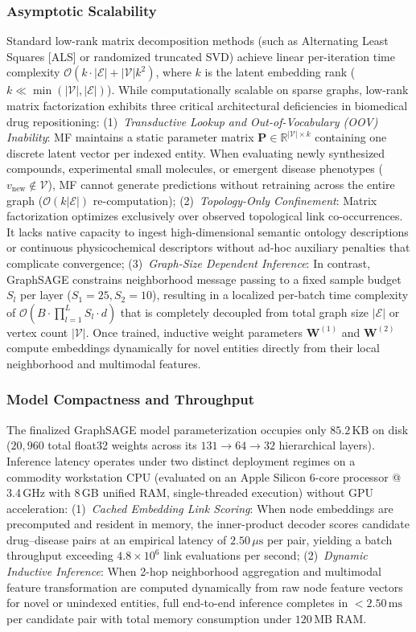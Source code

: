 \documentclass[conference,a4paper]{IEEEtran}
\begin{document}
\subsubsection{Asymptotic Scalability}
Standard low-rank matrix decomposition methods (such as Alternating Least Squares [ALS] or randomized truncated SVD) achieve linear per-iteration time complexity $\mathcal{O}(k \cdot |\mathcal{E}| + |\mathcal{V}| k^2)$, where $k$ is the latent embedding rank ($k \ll \min(|\mathcal{V}|, |\mathcal{E}|)$). While computationally scalable on sparse graphs, low-rank matrix factorization exhibits three critical architectural deficiencies in biomedical drug repositioning:
(1)~\textit{Transductive Lookup and Out-of-Vocabulary (OOV) Inability}: MF maintains a static parameter matrix $\mathbf{P} \in \mathbb{R}^{|\mathcal{V}| \times k}$ containing one discrete latent vector per indexed entity. When evaluating newly synthesized compounds, experimental small molecules, or emergent disease phenotypes ($v_{\text{new}} \notin \mathcal{V}$), MF cannot generate predictions without retraining across the entire graph ($\mathcal{O}(k |\mathcal{E}|)$ re-computation);
(2)~\textit{Topology-Only Confinement}: Matrix factorization optimizes exclusively over observed topological link co-occurrences. It lacks native capacity to ingest high-dimensional semantic ontology descriptions or continuous physicochemical descriptors without ad-hoc auxiliary penalties that complicate convergence;
(3)~\textit{Graph-Size Dependent Inference}: In contrast, GraphSAGE constrains neighborhood message passing to a fixed sample budget $S_l$ per layer ($S_1=25, S_2=10$), resulting in a localized per-batch time complexity of $\mathcal{O}(B \cdot \prod_{l=1}^L S_l \cdot d)$ that is completely decoupled from total graph size $|\mathcal{E}|$ or vertex count $|\mathcal{V}|$. Once trained, inductive weight parameters $\mathbf{W}^{(1)}$ and $\mathbf{W}^{(2)}$ compute embeddings dynamically for novel entities directly from their local neighborhood and multimodal features.

\subsubsection{Model Compactness and Throughput}
The finalized GraphSAGE model parameterization occupies only $85.2\,\mathrm{KB}$ on disk ($20,960$ total float32 weights across its $131 \to 64 \to 32$ hierarchical layers). Inference latency operates under two distinct deployment regimes on a commodity workstation CPU (evaluated on an Apple Silicon 6-core processor @ 3.4\,GHz with 8\,GB unified RAM, single-threaded execution) without GPU acceleration:
(1)~\textit{Cached Embedding Link Scoring}: When node embeddings are precomputed and resident in memory, the inner-product decoder scores candidate drug--disease pairs at an empirical latency of $2.50\,\mu\mathrm{s}$ per pair, yielding a batch throughput exceeding $4.8 \times 10^6$ link evaluations per second;
(2)~\textit{Dynamic Inductive Inference}: When 2-hop neighborhood aggregation and multimodal feature transformation are computed dynamically from raw node feature vectors for novel or unindexed entities, full end-to-end inference completes in $<2.50\,\mathrm{ms}$ per candidate pair with total memory consumption under $120\,\mathrm{MB}$ RAM.
\end{document}
